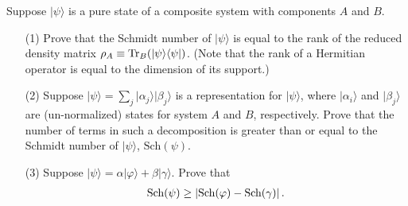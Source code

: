 \documentclass[en]{sol-man}
\begin{document}
\begin{prob}
    Suppose $\lvert\psi\rangle$ is a pure state of a composite system with components $A$ and $B$.
    \begin{itemize}
        \item[(1)] Prove that the Schmidt number of $\lvert\psi\rangle$ is equal to the rank of the reduced density matrix $\rho_A\equiv\operatorname{Tr}_B(\lvert\psi\rangle\langle\psi\rvert)$. (Note that the rank of a Hermitian operator is equal to the dimension of its support.)
        \item[(2)] Suppose $\lvert\psi\rangle=\sum_j\lvert\alpha_j\rangle\lvert\beta_j\rangle$ is a representation for $\lvert\psi\rangle$, where $\lvert\alpha_i\rangle$ and $\lvert\beta_j\rangle$ are (un-normalized) states for system $A$ and $B$, respectively. Prove that the number of terms in such a decomposition is greater than or equal to the Schmidt number of $\lvert\psi\rangle$, $\text{Sch}(\psi)$.
        \item[(3)] Suppose $\lvert\psi\rangle=\alpha\lvert\varphi\rangle+\beta\lvert\gamma\rangle$. Prove that
        \begin{align}
            \text{Sch}(\psi)\geq\left\lvert\text{Sch}(\varphi)-\text{Sch}(\gamma)\right\rvert.
        \end{align}
    \end{itemize}
\end{prob}
\end{document}
